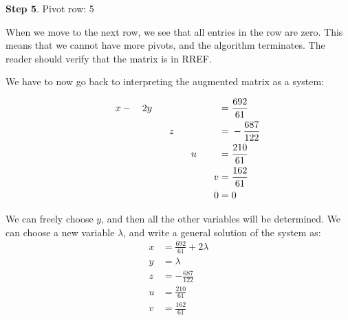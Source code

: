\documentclass[12pt]{article}
\begin{document}
\begin{example}
\textbf{Step 5}. Pivot row: 5

When we move to the next row, we see that all entries in the row are zero. This means that we cannot have more pivots, and the algorithm terminates. The reader should verify that the matrix is in RREF.

We have to now go back to interpreting the augmented matrix as a system:

\begin{alignat*}{13}
 &{}\hphantom{+}{}& x &{}-{}& 2 y&{}\hphantom{+}{}&&{}\hphantom{+}{}&&{}\hphantom{+}{}& &{}={}\frac{692}{61}\\ 
&{}\hphantom{+}{}&&{}\hphantom{+}{}& &{}\hphantom{+}{}& z&{}\hphantom{+}{}&&{}\hphantom{+}{}& &{}={}- \frac{687}{122}\\ 
&{}\hphantom{+}{}&&{}\hphantom{+}{}&&{}\hphantom{+}{}& &{}\hphantom{+}{}& u&{}\hphantom{+}{}& &{}={}\frac{210}{61}\\ 
&{}\hphantom{+}{}&&{}\hphantom{+}{}&&{}\hphantom{+}{}&&{}\hphantom{+}{}& &{}\hphantom{+}{}& v &{}={}\frac{162}{61}\\ 
&{}\hphantom{+}{}&&{}\hphantom{+}{}&&{}\hphantom{+}{}&&{}\hphantom{+}{}&&{}\hphantom{+}{}&0 &{}={}0\\ 
\end{alignat*}

We can freely choose $y$, and then all the other variables will be determined. We can choose a new variable $\lambda$, and write a general solution of the system as:
\begin{align*}
x &= \frac{692}{61}+2\lambda\\
y &= \lambda\\
z &= - \frac{687}{122}\\
u &= \frac{210}{61}\\
v &= \frac{162}{61}\\
\end{align*}


\end{example}
\end{document}

